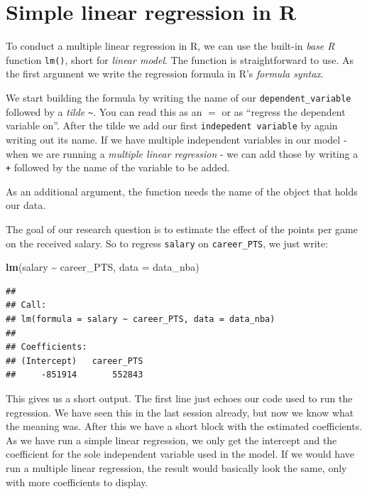 \documentclass[
]{book}
\newenvironment{Shaded}{\begin{snugshade}}{\end{snugshade}}
\newcommand{\AttributeTok}[1]{\textcolor[rgb]{0.13,0.29,0.53}{#1}}
\newcommand{\FunctionTok}[1]{\textcolor[rgb]{0.13,0.29,0.53}{\textbf{#1}}}
\newcommand{\NormalTok}[1]{#1}
\newcommand{\SpecialCharTok}[1]{\textcolor[rgb]{0.81,0.36,0.00}{\textbf{#1}}}
\begin{document}
\hypertarget{simple-linear-regression-in-r}{%
\section{Simple linear regression in R}\label{simple-linear-regression-in-r}}

To conduct a multiple linear regression in R, we can use the built-in \emph{base R}
function \texttt{lm()}, short for \emph{linear model}.
The function is straightforward to use. As the first argument
we write the regression formula in R's \emph{formula syntax}.

We start building the formula by writing the name of our \texttt{dependent\_variable}
followed by a \emph{tilde} \texttt{\textasciitilde{}}. You can read this as an \(=\) or as ``regress the
dependent variable on''. After the tilde we add our first \texttt{indepedent\ variable}
by again writing out its name. If we have multiple independent variables in our
model - when we are running a \emph{multiple linear regression} - we can add those by
writing a \texttt{+} followed by the name of the variable to be added.

As an additional argument, the function needs the name of the object that holds our
data.

The goal of our research question is to estimate the effect of the points per
game on the received salary. So to regress \texttt{salary} on \texttt{career\_PTS}, we just
write:

\begin{Shaded}
\begin{Highlighting}[]
\FunctionTok{lm}\NormalTok{(salary }\SpecialCharTok{\textasciitilde{}}\NormalTok{ career\_PTS, }\AttributeTok{data =}\NormalTok{ data\_nba)}
\end{Highlighting}
\end{Shaded}

\begin{verbatim}
## 
## Call:
## lm(formula = salary ~ career_PTS, data = data_nba)
## 
## Coefficients:
## (Intercept)   career_PTS  
##     -851914       552843
\end{verbatim}

This gives us a short output. The first line just echoes our code used to run
the regression. We have seen this in the last session already, but now we know
what the meaning was. After this we have a short block with the estimated
coefficients. As we have run a simple linear regression, we only get the
intercept and the coefficient for the sole independent variable used in the
model. If we would have run a multiple linear regression, the result would
basically look the same, only with more coefficients to display.
\end{document}
